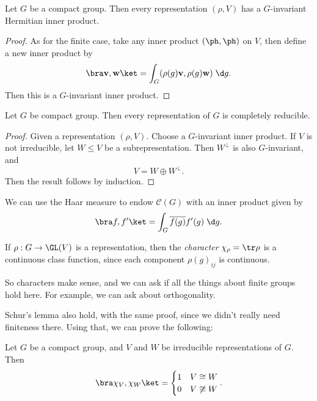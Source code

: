 \documentclass[a4paper]{article}
\begin{document}
\begin{cor}
  Let $G$ be a compact group. Then every representation $(\rho, V)$ has a $G$-invariant Hermitian inner product.
\end{cor}

\begin{proof}
  As for the finite case, take any inner product $(\ph, \ph)$ on $V$, then define a new inner product by
  \[
    \bra \mathbf{v}, \mathbf{w}\ket = \int_G (\rho(g)\mathbf{v}, \rho(g)\mathbf{w})\;\d g.
  \]
  Then this is a $G$-invariant inner product.
\end{proof}

\begin{thm}
  Let $G$ be compact group. Then every representation of $G$ is completely reducible.
\end{thm}

\begin{proof}
  Given a representation $(\rho, V)$. Choose a $G$-invariant inner product. If $V$ is not irreducible, let $W \leq V$ be a subrepresentation. Then $W^\perp$ is also $G$-invariant, and
  \[
    V = W \oplus W^\perp.
  \]
  Then the result follows by induction.
\end{proof}

We can use the Haar measure to endow $\mathcal{C}(G)$ with an inner product given by
\[
  \bra f, f'\ket = \int_G \overline{f(g)} f'(g) \;\d g.
\]
\begin{defi}[Character]
  If $\rho: G \to \GL(V)$ is a representation, then the \emph{character} $\chi_\rho = \tr \rho$ is a continuous class function, since each component $\rho(g)_{ij}$ is continuous.
\end{defi}

So characters make sense, and we can ask if all the things about finite groups hold here. For example, we can ask about orthogonality.

Schur's lemma also hold, with the same proof, since we didn't really need finiteness there. Using that, we can prove the following:

\begin{thm}[Orthogonality]
  Let $G$ be a compact group, and $V$ and $W$ be irreducible representations of $G$. Then
  \[
    \bra \chi_V, \chi_W\ket =
    \begin{cases}
      1 & V \cong W\\
      0 & V \not\cong W
    \end{cases}.
  \]
\end{thm}
\end{document}
